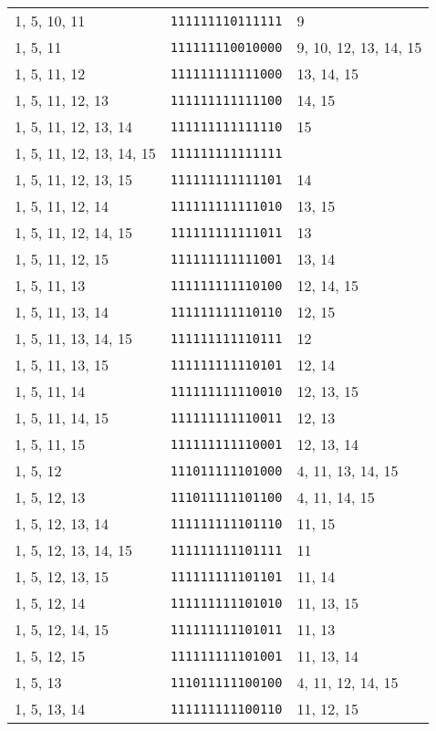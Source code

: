\documentclass[a4paper,12pt]{article}
\begin{document}
\begin{longtable}{l|l|l}
        1, 5, 10, 11&\texttt{111111110111111}&9\\
        1, 5, 11&\texttt{111111110010000}&9, 10, 12, 13, 14, 15\\
        1, 5, 11, 12&\texttt{111111111111000}&13, 14, 15\\
        1, 5, 11, 12, 13&\texttt{111111111111100}&14, 15\\
        1, 5, 11, 12, 13, 14&\texttt{111111111111110}&15\\
        1, 5, 11, 12, 13, 14, 15&\texttt{111111111111111}&\\
        1, 5, 11, 12, 13, 15&\texttt{111111111111101}&14\\
        1, 5, 11, 12, 14&\texttt{111111111111010}&13, 15\\
        1, 5, 11, 12, 14, 15&\texttt{111111111111011}&13\\
        1, 5, 11, 12, 15&\texttt{111111111111001}&13, 14\\
        1, 5, 11, 13&\texttt{111111111110100}&12, 14, 15\\
        1, 5, 11, 13, 14&\texttt{111111111110110}&12, 15\\
        1, 5, 11, 13, 14, 15&\texttt{111111111110111}&12\\
        1, 5, 11, 13, 15&\texttt{111111111110101}&12, 14\\
        1, 5, 11, 14&\texttt{111111111110010}&12, 13, 15\\
        1, 5, 11, 14, 15&\texttt{111111111110011}&12, 13\\
        1, 5, 11, 15&\texttt{111111111110001}&12, 13, 14\\
        1, 5, 12&\texttt{111011111101000}&4, 11, 13, 14, 15\\
        1, 5, 12, 13&\texttt{111011111101100}&4, 11, 14, 15\\
        1, 5, 12, 13, 14&\texttt{111111111101110}&11, 15\\
        1, 5, 12, 13, 14, 15&\texttt{111111111101111}&11\\
        1, 5, 12, 13, 15&\texttt{111111111101101}&11, 14\\
        1, 5, 12, 14&\texttt{111111111101010}&11, 13, 15\\
        1, 5, 12, 14, 15&\texttt{111111111101011}&11, 13\\
        1, 5, 12, 15&\texttt{111111111101001}&11, 13, 14\\
        1, 5, 13&\texttt{111011111100100}&4, 11, 12, 14, 15\\
        1, 5, 13, 14&\texttt{111111111100110}&11, 12, 15\\

\end{longtable}
\end{document}
